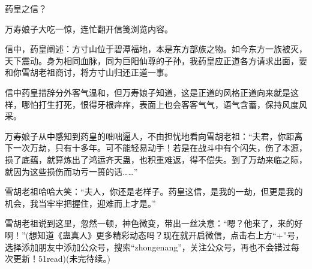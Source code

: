 \begin{this_body}
药皇之信？

万寿娘子大吃一惊，连忙翻开信笺浏览内容。

信中，药皇阐述：方寸山位于碧潭福地，本是东方部族之物。如今东方一族被灭，天下震动。身为相同血脉，同为巨阳仙尊的子孙，我药皇应正道各方请求出面，要和你雪胡老祖商讨，将方寸山归还正道一事。

信中药皇措辞分外客气温和，但万寿娘子知道，这是正道的风格正道向来就是这样，哪怕打生打死，恨得牙根痒痒，表面上也会客客气气，语气含蓄，保持风度风采。

万寿娘子从中感知到药皇的咄咄逼人，不由担忧地看向雪胡老祖：“夫君，你距离下一次万劫，只有十多年。可不能轻易动手！若是在战斗中有个闪失，伤了本源，损了底蕴，就算炼出了鸿运齐天蛊，也积重难返，得不偿失。到了万劫来临之际，就因为这些损伤而功亏一篑的话……”

雪胡老祖哈哈大笑：“夫人，你还是老样子。药皇这信，是我的一劫，但更是我的机会，我当牢牢把握住，迎难而上才是。”

雪胡老祖说到这里，忽然一顿，神色微变，带出一丝决意：“嗯？他来了，来的好啊！”(想知道《蛊真人》更多精彩动态吗？现在就开启微信，点击右上方“+”号，选择添加朋友中添加公众号，搜索“zhongenang”，关注公众号，再也不会错过每次更新！51read)(未完待续。)

\end{this_body}

